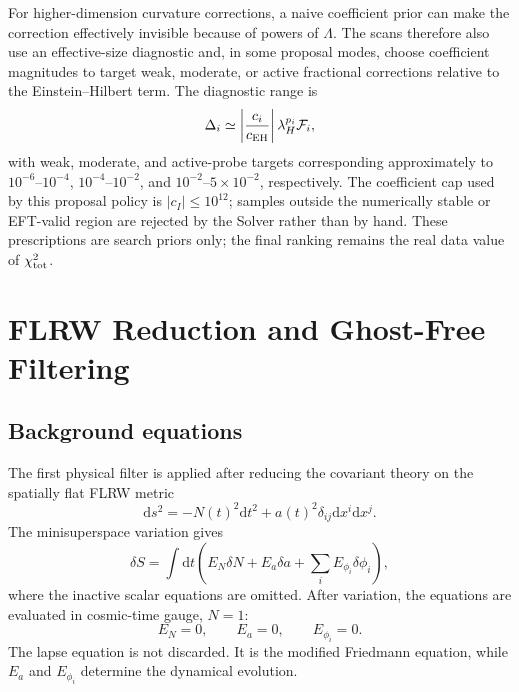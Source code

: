 \documentclass[aps,prd,twocolumn,superscriptaddress,nofootinbib,longbibliography]{revtex4-2}
\newcommand{\dd}{\mathrm{d}}
\newcommand{\Lam}{\Lambda}
\newcommand{\chiT}{\chi^2_{\rm tot}}
\begin{document}
For higher-dimension curvature corrections, a naive coefficient prior can make the correction effectively invisible because of powers of $\Lam$.  The scans therefore also use an effective-size diagnostic and, in some proposal modes, choose coefficient magnitudes to target weak, moderate, or active fractional corrections relative to the Einstein--Hilbert term.  The diagnostic range is
\begin{equation}
\Delta_i\simeq
\left|\frac{c_i}{c_{\rm EH}}\right|\lambda_H^{p_i}{\cal F}_i ,
\label{eq:delta-prior}
\end{equation}
with weak, moderate, and active-probe targets corresponding approximately to $10^{-6}$--$10^{-4}$, $10^{-4}$--$10^{-2}$, and $10^{-2}$--$5\times10^{-2}$, respectively.  The coefficient cap used by this proposal policy is $|c_I|\le10^{12}$; samples outside the numerically stable or EFT-valid region are rejected by the Solver rather than by hand.  These prescriptions are search priors only; the final ranking remains the real data value of $\chiT$.

\section{FLRW Reduction and Ghost-Free Filtering}
\label{sec:ghost}

\subsection{Background equations}
\label{subsec:background-eom}

The first physical filter is applied after reducing the covariant theory on the spatially flat FLRW metric
\begin{equation}
\dd s^2=-N(t)^2\dd t^2+a(t)^2\delta_{ij}\dd x^i\dd x^j .
\label{eq:flrw}
\end{equation}
The minisuperspace variation gives
\begin{equation}
\delta S=\int \dd t\left(E_N\delta N+E_a\delta a+\sum_iE_{\phi_i}\delta\phi_i\right),
\label{eq:variation}
\end{equation}
where the inactive scalar equations are omitted.  After variation, the equations are evaluated in cosmic-time gauge, $N=1$:
\begin{equation}
E_N=0,\qquad E_a=0,\qquad E_{\phi_i}=0 .
\label{eq:eom-set}
\end{equation}
The lapse equation is not discarded.  It is the modified Friedmann equation, while $E_a$ and $E_{\phi_i}$ determine the dynamical evolution.
\end{document}

